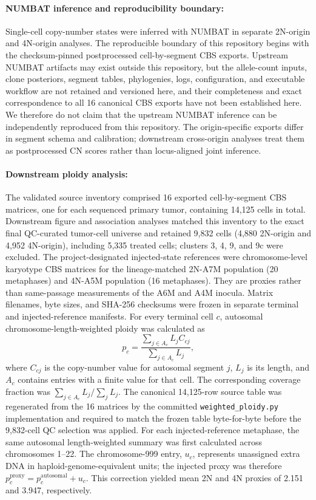 \documentclass[11pt,notitlepage]{article}
\begin{document}
\paragraph{NUMBAT inference and reproducibility boundary:} Single-cell copy-number states were inferred with NUMBAT in separate 2N-origin and 4N-origin analyses. The reproducible boundary of this repository begins with the checksum-pinned postprocessed cell-by-segment CBS exports. Upstream NUMBAT artifacts may exist outside this repository, but the allele-count inputs, clone posteriors, segment tables, phylogenies, logs, configuration, and executable workflow are not retained and versioned here, and their completeness and exact correspondence to all 16 canonical CBS exports have not been established here. We therefore do not claim that the upstream NUMBAT inference can be independently reproduced from this repository. The origin-specific exports differ in segment schema and calibration; downstream cross-origin analyses treat them as postprocessed CN scores rather than locus-aligned joint inference.

\paragraph{Downstream ploidy analysis:} The validated source inventory comprised 16 exported cell-by-segment CBS matrices, one for each sequenced primary tumor, containing 14,125 cells in total. Downstream figure and association analyses matched this inventory to the exact final QC-curated tumor-cell universe and retained 9,832 cells (4,880 2N-origin and 4,952 4N-origin), including 5,335 treated cells; clusters 3, 4, 9, and 9c were excluded. The project-designated injected-state references were chromosome-level karyotype CBS matrices for the lineage-matched 2N-A7M population (20 metaphases) and 4N-A5M population (16 metaphases). They are proxies rather than same-passage measurements of the A6M and A4M inocula. Matrix filenames, byte sizes, and SHA-256 checksums were frozen in separate terminal and injected-reference manifests. For every terminal cell \(c\), autosomal chromosome-length-weighted ploidy was calculated as
\[
p_c = \frac{\sum_{j\in A_c} L_j C_{cj}}{\sum_{j\in A_c} L_j},
\]
where \(C_{cj}\) is the copy-number value for autosomal segment \(j\), \(L_j\) is its length, and \(A_c\) contains entries with a finite value for that cell. The corresponding coverage fraction was \(\sum_{j\in A_c}L_j/\sum_jL_j\). The canonical 14,125-row source table was regenerated from the 16 matrices by the committed \texttt{weighted\_ploidy.py} implementation and required to match the frozen table byte-for-byte before the 9,832-cell QC selection was applied. For each injected-reference metaphase, the same autosomal length-weighted summary was first calculated across chromosomes 1--22. The chromosome-999 entry, \(u_c\), represents unassigned extra DNA in haploid-genome-equivalent units; the injected proxy was therefore \(p^{\mathrm{proxy}}_c=p^{\mathrm{autosomal}}_c+u_c\). This correction yielded mean 2N and 4N proxies of 2.151 and 3.947, respectively.
\end{document}
